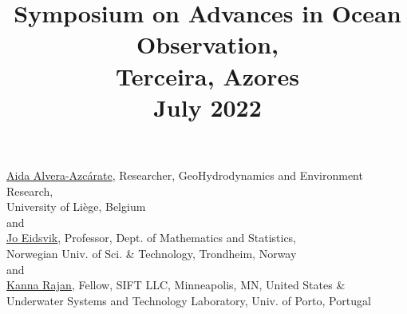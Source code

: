 \documentclass[12pt,letterpaper]{article}
\title{Symposium on Advances in Ocean Observation,\\
  Terceira, Azores \\ \large{\textbf{July 2022}}}
\date{}
\begin{document}
\maketitle{}

\vspace{-1.75cm}
\begin{center}
   \href{http://modb.oce.ulg.ac.be/mediawiki/index.php/User:Aida}{\textsf{Aida Alvera-Azc\'{a}rate}},
  Researcher, GeoHydrodynamics and Environment Research,\\
  University of Li\`{e}ge, Belgium\\
  and\\
  \href{https://www.ntnu.edu/employees/jo.eidsvik}{\textsf{Jo Eidsvik}},
  Professor, Dept. of Mathematics and Statistics, \\Norwegian Univ. of
  Sci. \& Technology, Trondheim, Norway\\
  and\\
  \href{https://kanna.rajan.systems}{\textsf{Kanna Rajan}},
  Fellow, SIFT LLC, Minneapolis, MN, United States \& \\Underwater Systems and Technology
  Laboratory, Univ. of Porto, Portugal\\
\end{center}





\newpage


\renewcommand{\thepage}{}
\end{document}
